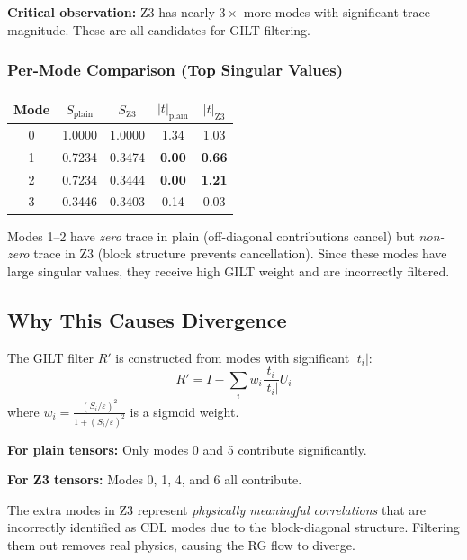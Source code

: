 \documentclass{article}
\begin{document}
\textbf{Critical observation:} Z3 has nearly $3\times$ more modes with significant trace magnitude. These are all candidates for GILT filtering.

\subsubsection{Per-Mode Comparison (Top Singular Values)}

\begin{center}
\begin{tabular}{|c|c|c|c|c|}
\hline
\textbf{Mode} & $S_{\text{plain}}$ & $S_{\text{Z3}}$ & $|t|_{\text{plain}}$ & $|t|_{\text{Z3}}$ \\
\hline
0 & 1.0000 & 1.0000 & 1.34 & 1.03 \\
1 & 0.7234 & 0.3474 & \textbf{0.00} & \textbf{0.66} \\
2 & 0.7234 & 0.3444 & \textbf{0.00} & \textbf{1.21} \\
3 & 0.3446 & 0.3403 & 0.14 & 0.03 \\
\hline
\end{tabular}
\end{center}

Modes 1--2 have \textit{zero} trace in plain (off-diagonal contributions cancel) but \textit{non-zero} trace in Z3 (block structure prevents cancellation). Since these modes have large singular values, they receive high GILT weight and are incorrectly filtered.

\subsection{Why This Causes Divergence}

The GILT filter $R'$ is constructed from modes with significant $|t_i|$:
\begin{equation}
    R' = I - \sum_i w_i \frac{t_i}{|t_i|} U_i
\end{equation}
where $w_i = \frac{(S_i/\varepsilon)^2}{1 + (S_i/\varepsilon)^2}$ is a sigmoid weight.

\textbf{For plain tensors:} Only modes 0 and 5 contribute significantly.

\textbf{For Z3 tensors:} Modes 0, 1, 4, and 6 all contribute.

The extra modes in Z3 represent \textit{physically meaningful correlations} that are incorrectly identified as CDL modes due to the block-diagonal structure. Filtering them out removes real physics, causing the RG flow to diverge.
\end{document}
